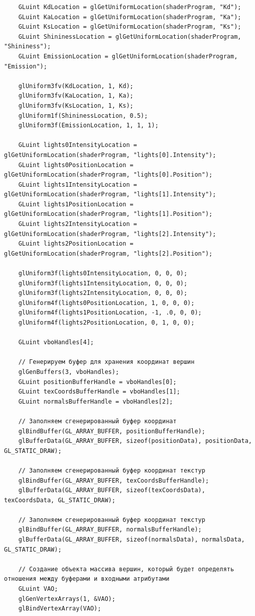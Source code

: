 \documentclass[a4paper,14pt]{extarticle}
\begin{document}
\begin{verbatim}
	GLuint KdLocation = glGetUniformLocation(shaderProgram, "Kd");
	GLuint KaLocation = glGetUniformLocation(shaderProgram, "Ka");
	GLuint KsLocation = glGetUniformLocation(shaderProgram, "Ks");
	GLuint ShininessLocation = glGetUniformLocation(shaderProgram, "Shininess");
	GLuint EmissionLocation = glGetUniformLocation(shaderProgram, "Emission");

	glUniform3fv(KdLocation, 1, Kd);
	glUniform3fv(KaLocation, 1, Ka);
	glUniform3fv(KsLocation, 1, Ks);
	glUniform1f(ShininessLocation, 0.5);
	glUniform3f(EmissionLocation, 1, 1, 1);

	GLuint lights0IntensityLocation = glGetUniformLocation(shaderProgram, "lights[0].Intensity");
	GLuint lights0PositionLocation = glGetUniformLocation(shaderProgram, "lights[0].Position");
	GLuint lights1IntensityLocation = glGetUniformLocation(shaderProgram, "lights[1].Intensity");
	GLuint lights1PositionLocation = glGetUniformLocation(shaderProgram, "lights[1].Position");
	GLuint lights2IntensityLocation = glGetUniformLocation(shaderProgram, "lights[2].Intensity");
	GLuint lights2PositionLocation = glGetUniformLocation(shaderProgram, "lights[2].Position");

	glUniform3f(lights0IntensityLocation, 0, 0, 0);
	glUniform3f(lights1IntensityLocation, 0, 0, 0);
	glUniform3f(lights2IntensityLocation, 0, 0, 0);
	glUniform4f(lights0PositionLocation, 1, 0, 0, 0);
	glUniform4f(lights1PositionLocation, -1, .0, 0, 0);
	glUniform4f(lights2PositionLocation, 0, 1, 0, 0);

	GLuint vboHandles[4];

	// Генерируем буфер для хранения координат вершин
	glGenBuffers(3, vboHandles);
	GLuint positionBufferHandle = vboHandles[0];
	GLuint texCoordsBufferHandle = vboHandles[1];
	GLuint normalsBufferHandle = vboHandles[2];

	// Заполняем сгенерированный буфер координат
	glBindBuffer(GL_ARRAY_BUFFER, positionBufferHandle);
	glBufferData(GL_ARRAY_BUFFER, sizeof(positionData), positionData, GL_STATIC_DRAW);

	// Заполняем сгенерированный буфер координат текстур
	glBindBuffer(GL_ARRAY_BUFFER, texCoordsBufferHandle);
	glBufferData(GL_ARRAY_BUFFER, sizeof(texCoordsData), texCoordsData, GL_STATIC_DRAW);

	// Заполняем сгенерированный буфер координат текстур
	glBindBuffer(GL_ARRAY_BUFFER, normalsBufferHandle);
	glBufferData(GL_ARRAY_BUFFER, sizeof(normalsData), normalsData, GL_STATIC_DRAW);

	// Создание объекта массива вершин, который будет определять отношения между буферами и входными атрибутами
	GLuint VAO;
	glGenVertexArrays(1, &VAO);
	glBindVertexArray(VAO);


\end{verbatim}
\end{document}
